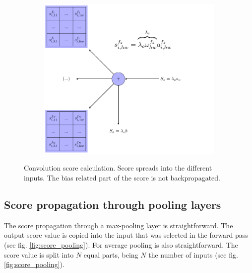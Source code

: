 \documentclass[review]{elsarticle}
\theoremstyle{definition} %
\theoremstyle{remark}
\begin{document}
\begin{figure}[!ht]
\begin{subfigure}{0.4\textwidth}
		\includegraphics[scale=0.4]{./figures/score_conv2d_score.pdf}
	\end{subfigure}
	\caption{Convolution score calculation. Score spreads into the different inputs. The bias related part of the score is not backpropagated.}
	\label{fig:convolution_score}
\end{figure}


\subsection{Score propagation through pooling layers}

The score propagation through a max-pooling layer is straightforward. The output score value is copied into the input that was selected in the forward pass (see fig. \ref{fig:score_pooling}). For average pooling is also straightforward. The score value is split into $N$ equal parts, being $N$ the number of inputs (see fig. \ref{fig:score_pooling}).
\end{document}
